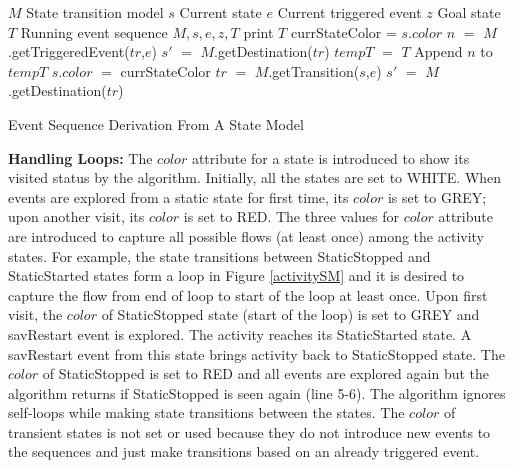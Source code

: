 \documentclass[10pt]{elsarticle}
\begin{document}
\begin{algorithm}[ht!]
 \begin{algorithmic}[1]
 \INPUT 
\Statex $M$ \Comment State transition model
\Statex $s$ \Comment  Current state
\Statex $e$ \Comment Current triggered event
\Statex $z$ \Comment Goal state
\Statex $T$ \Comment Running event sequence
 {$M, s, e, z,T$}
		\State print $T$  
		\State \Return
		\State \Return
	\Else
			\State currStateColor = $s$.$color$
			\Else 
			\EndIf    
				\State $n$ $=$ $M$.getTriggeredEvent($tr$,$e$)
				\State $s'$ $=$ $M$.getDestination($tr$)
				\State $tempT$ $=$ $T$
				 	
					\State Append $n$ to $tempT$ 
				\EndIf	
			\EndFor
		       \State $s$.$color$ $=$ currStateColor
			\State $tr$ $=$ $M$.getTransition($s$,$e$) 
			\State $s'$ $=$ $M$.getDestination($tr$)
			  
			\EndIf
		\EndIf
	\EndIf 	
\EndProcedure

  \end{algorithmic}
 \caption{Event Sequence Derivation From A State Model}
 \label{eventDerivation}
\end{algorithm}

{\noindent \bf{Handling Loops:}} The $color$ attribute for a state is introduced to show its visited status by the algorithm. Initially, all the states are set to WHITE. When events are explored from a static state for first time, its $color$ is set to GREY; upon another visit, its $color$ is set to RED. The three values for $color$ attribute are introduced to capture all possible flows (at least once) among the activity states. For example, the state transitions between StaticStopped and StaticStarted states form a loop in Figure \ref{activitySM} and it is desired to capture the flow from end of loop to start of the loop at least once. Upon first visit, the $color$ of StaticStopped state (start of the loop) is set to GREY and savRestart event is explored. The activity reaches its StaticStarted state. A savRestart event from this state brings activity back to StaticStopped state. The $color$ of StaticStopped is set to RED and all events are explored again but the algorithm returns if StaticStopped is seen again (line 5-6). The algorithm ignores self-loops while making state transitions between the states. The $color$ of transient states is not set or used because they do not introduce new events to the sequences and just make transitions based on an already triggered event. 
\end{document}
